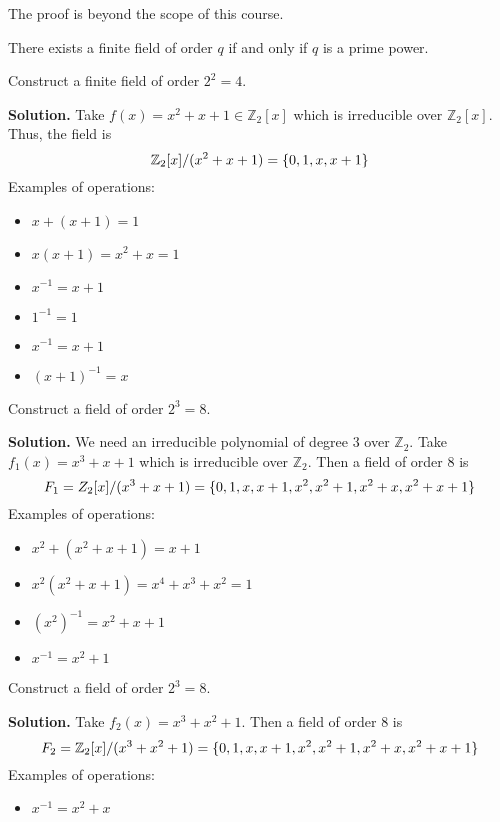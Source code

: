 The proof is beyond the scope of this course.

\begin{Theorem}{}{}
    There exists a finite field of order $ q $ if and only if
    $ q $ is a prime power.
\end{Theorem}

\begin{Example}{}{}
    Construct a finite field of order $ 2^2=4 $.

    \textbf{Solution.} Take $ f(x)=x^2+x+1\in\mathbb{Z}_2[x] $
    which is irreducible over $ \mathbb{Z}_2[x] $. Thus, the field is
    \[ \mathbb{Z}_2[x]/(x^2+x+1)=\{0,1,x,x+1\} \]
    Examples of operations:
    \begin{itemize}
        \item $ x+(x+1)=1 $
        \item $ x(x+1)=x^2+x=1 $
        \item $ x^{-1}=x+1 $
        \item $ 1^{-1}=1 $
        \item $ x^{-1}=x+1 $
        \item $ (x+1)^{-1}=x $
    \end{itemize}
\end{Example}

\begin{Example}{}{}
    Construct a field of order $ 2^3=8 $.

    \textbf{Solution.} We need an irreducible polynomial of degree $ 3 $
    over $ \mathbb{Z}_2 $. Take $ f_1(x)=x^3+x+1 $ which is
    irreducible over $ \mathbb{Z}_2 $. Then a field of order $ 8 $ is
    \[ F_1=Z_2[x]/(x^3+x+1)=\{0,1,x,x+1,x^2,x^2+1,x^2+x,x^2+x+1\} \]
    Examples of operations:
    \begin{itemize}
        \item $ x^2+(x^2+x+1)=x+1 $
        \item $ x^2(x^2+x+1)=x^4+x^3+x^2=1 $
        \item $ (x^2)^{-1}=x^2+x+1 $
        \item $ x^{-1}=x^2+1 $
    \end{itemize}
\end{Example}



\begin{Example}{}{}
    Construct a field of order $ 2^3=8 $.

    \textbf{Solution.} Take $ f_2(x)=x^3+x^2+1 $. Then a field of order $ 8 $ is
    \[ F_2=\mathbb{Z}_2[x]/(x^3+x^2+1)=\{0,1,x,x+1,x^2,x^2+1,x^2+x,x^2+x+1\} \]
    Examples of operations:
    \begin{itemize}
        \item $ x^{-1}=x^2+x $
    \end{itemize}
\end{Example}

